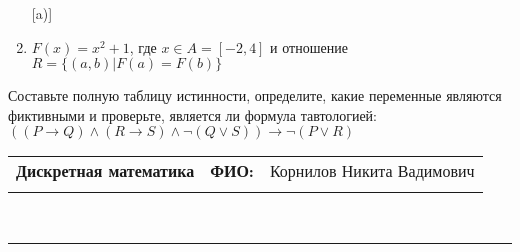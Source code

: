 \documentclass[10pt]{exam}
\newcommand{\class}{Дискретная математика}
\newcommand{\examdate}{}
\begin{document}
\begin{questions}
\begin{enumerate} [a)]
\item $F(x)=x^{2}+1$, где $x \in A = [-2, 4]$ и отношение $R = \{(a,b)|F(a) = F(b)\}$
\end{enumerate}\question Составьте полную таблицу истинности, определите, какие переменные являются фиктивными и проверьте, является ли формула тавтологией:
$((P \rightarrow Q) \land (R \rightarrow S) \land \neg (Q \lor S)) \rightarrow \neg (P \lor R)$

\end{questions}
\newpage
\begin{flushright}
\begin{tabular}{p{2.8in} r l}
\textbf{\class} & \textbf{ФИО:} &Корнилов Никита Вадимович
\\

\textbf{\examdate} &&\\
\end{tabular}\\
\end{flushright}
\rule[1ex]{\textwidth}{.1pt}
\end{document}
